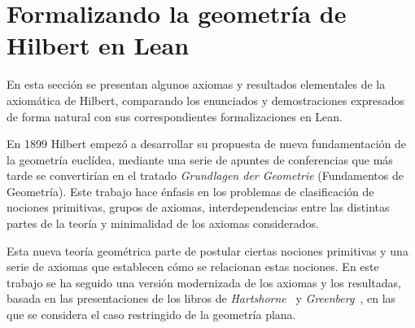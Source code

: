 \section{Formalizando la geometr\'{i}a de Hilbert en Lean}


En esta sección se presentan algunos axiomas y resultados elementales de la
axiomática de Hilbert, comparando los enunciados y demostraciones expresados de
forma natural con sus correspondientes formalizaciones en Lean.

En 1899 Hilbert empezó a desarrollar su propuesta de nueva fundamentación de la
geometría euclídea, mediante una serie de apuntes de conferencias que más tarde
se convertirían en el tratado \textit{Grundlagen der Geometrie} (Fundamentos de
Geometría). Este trabajo hace énfasis en los problemas de clasificación de
nociones primitivas, grupos de axiomas, interdependencias entre las distintas
partes de la teoría y minimalidad de los axiomas considerados.

Esta nueva teoría geométrica parte de postular ciertas nociones primitivas y una
serie de axiomas que establecen cómo se relacionan estas nociones. En este
trabajo se ha seguido una versión modernizada de los axiomas y los resultadas,
basada en las presentaciones de los libros de
\textit{Hartshorne}~\cite{hartshorneGeometryEuclid2000} y
\textit{Greenberg}~\cite{greenbergEuclideanNonEuclideanGeometries1993}, en las
que se considera el caso restringido de la geometría plana.


